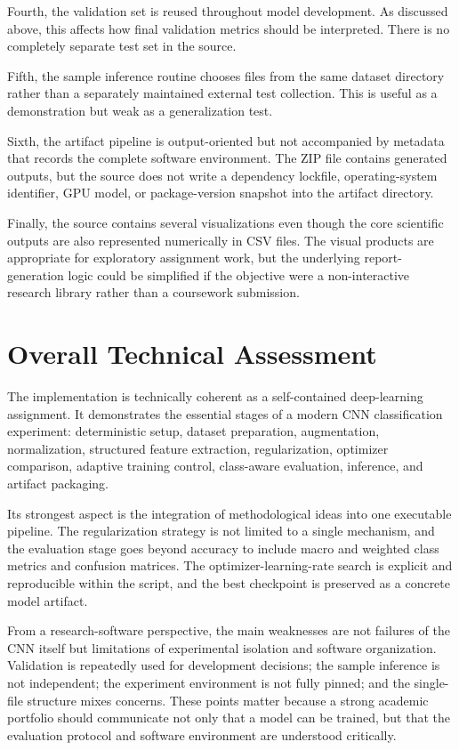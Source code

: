 \documentclass[11pt,a4paper]{article}
\begin{document}
Fourth, the validation set is reused throughout model development. As discussed above, this affects how final validation metrics should be interpreted. There is no completely separate test set in the source.

Fifth, the sample inference routine chooses files from the same dataset directory rather than a separately maintained external test collection. This is useful as a demonstration but weak as a generalization test.

Sixth, the artifact pipeline is output-oriented but not accompanied by metadata that records the complete software environment. The ZIP file contains generated outputs, but the source does not write a dependency lockfile, operating-system identifier, GPU model, or package-version snapshot into the artifact directory.

Finally, the source contains several visualizations even though the core scientific outputs are also represented numerically in CSV files. The visual products are appropriate for exploratory assignment work, but the underlying report-generation logic could be simplified if the objective were a non-interactive research library rather than a coursework submission.

\section{Overall Technical Assessment}
The implementation is technically coherent as a self-contained deep-learning assignment. It demonstrates the essential stages of a modern CNN classification experiment: deterministic setup, dataset preparation, augmentation, normalization, structured feature extraction, regularization, optimizer comparison, adaptive training control, class-aware evaluation, inference, and artifact packaging.

Its strongest aspect is the integration of methodological ideas into one executable pipeline. The regularization strategy is not limited to a single mechanism, and the evaluation stage goes beyond accuracy to include macro and weighted class metrics and confusion matrices. The optimizer-learning-rate search is explicit and reproducible within the script, and the best checkpoint is preserved as a concrete model artifact.

From a research-software perspective, the main weaknesses are not failures of the CNN itself but limitations of experimental isolation and software organization. Validation is repeatedly used for development decisions; the sample inference is not independent; the experiment environment is not fully pinned; and the single-file structure mixes concerns. These points matter because a strong academic portfolio should communicate not only that a model can be trained, but that the evaluation protocol and software environment are understood critically.
\end{document}

